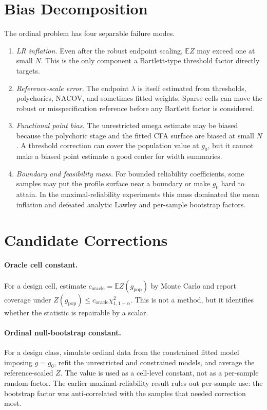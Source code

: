 \documentclass[11pt]{article}
\newcommand{\E}{\mathbb{E}}
\theoremstyle{plain}
\theoremstyle{remark}
\begin{document}
\section{Bias Decomposition}

The ordinal problem has four separable failure modes.

\begin{enumerate}
\item \emph{LR inflation.} Even after the robust endpoint scaling, $\E Z$ may
exceed one at small $N$. This is the only component a Bartlett-type threshold
factor directly targets.
\item \emph{Reference-scale error.} The endpoint $\lambda$ is itself estimated
from thresholds, polychorics, NACOV, and sometimes fitted weights. Sparse cells
can move the robust or misspecification reference before any Bartlett factor is
considered.
\item \emph{Functional point bias.} The unrestricted omega estimate may be
biased because the polychoric stage and the fitted CFA surface are biased at
small $N$. A threshold correction can cover the population value at $g_0$, but
it cannot make a biased point estimate a good center for width summaries.
\item \emph{Boundary and feasibility mass.} For bounded reliability coefficients,
some samples may put the profile surface near a boundary or make $g_0$ hard to
attain. In the maximal-reliability experiments this mass dominated the mean
inflation and defeated analytic Lawley and per-sample bootstrap factors.
\end{enumerate}

\section{Candidate Corrections}

\paragraph{Oracle cell constant.}
For a design cell, estimate $c_{\mathrm{oracle}}=\E Z(g_{\mathrm{pop}})$ by
Monte Carlo and report coverage under
$Z(g_{\mathrm{pop}})\le c_{\mathrm{oracle}}\chi^2_{1,1-\alpha}$. This is not a
method, but it identifies whether the statistic is repairable by a scalar.

\paragraph{Ordinal null-bootstrap constant.}
For a design class, simulate ordinal data from the constrained fitted model
imposing $g=g_0$, refit the unrestricted and constrained models, and average the
reference-scaled $Z$. The value is used as a cell-level constant, not as a
per-sample random factor. The earlier maximal-reliability result rules out
per-sample use: the bootstrap factor was anti-correlated with the samples that
needed correction most.
\end{document}
